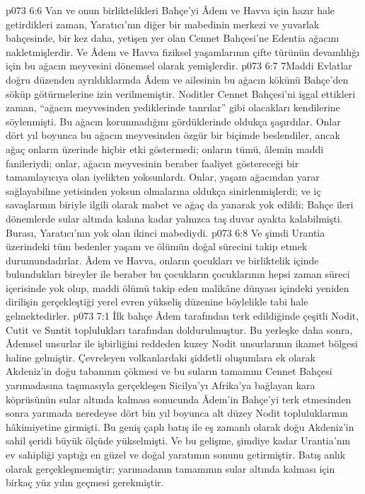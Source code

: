 \vs p073 6:6 Van ve onun birliktelikleri Bahçe’yi Âdem ve Havva için hazır hale getirdikleri zaman, Yaratıcı’nın diğer bir mabedinin merkezi ve yuvarlak bahçesinde, bir kez daha, yetişen yer olan Cennet Bahçesi’ne Edentia ağacını nakletmişlerdir. Ve Âdem ve Havva fiziksel yaşamlarının çifte türünün devamlılığı için bu ağacın meyvesini dönemsel olarak yemişlerdir.
\vs p073 6:7 7Maddi Evlatlar doğru düzenden ayrıldıklarında Âdem ve ailesinin bu ağacın kökünü Bahçe’den söküp götürmelerine izin verilmemiştir. Noditler Cennet Bahçesi’ni işgal ettikleri zaman, “ağacın meyvesinden yediklerinde tanrılar” gibi olacakları kendilerine söylenmişti. Bu ağacın korunmadığını gördüklerinde oldukça şaşırdılar. Onlar dört yıl boyunca bu ağacın meyvesinden özgür bir biçimde beslendiler, ancak ağaç onların üzerinde hiçbir etki göstermedi; onların tümü, âlemin maddi fanileriydi; onlar, ağacın meyvesinin beraber faaliyet göstereceği bir tamamlayıcıya olan iyelikten yoksunlardı. Onlar, yaşam ağacından yarar sağlayabilme yetisinden yoksun olmalarına oldukça sinirlenmişlerdi; ve iç savaşlarının biriyle ilgili olarak mabet ve ağaç da yanarak yok edildi; Bahçe ileri dönemlerde sular altında kalana kadar yalnızca taş duvar ayakta kalabilmişti. Burası, Yaratıcı’nın yok olan ikinci mabediydi.
\vs p073 6:8 Ve şimdi Urantia üzerindeki tüm bedenler yaşam ve ölümün doğal sürecini takip etmek durumundadırlar. Âdem ve Havva, onların çocukları ve birliktelik içinde bulundukları bireyler ile beraber bu çocukların çocuklarının hepsi zaman süreci içerisinde yok olup, maddi ölümü takip eden malikâne dünyası içindeki yeniden dirilişin gerçekleştiği yerel evren yükseliş düzenine böylelikle tabi hale gelmektedirler.
\vs p073 7:1 İlk bahçe Âdem tarafından terk edildiğinde çeşitli Nodit, Cutit ve Suntit toplulukları tarafından doldurulmuştur. Bu yerleşke daha sonra, Âdemsel unsurlar ile işbirliğini reddeden kuzey Nodit unsurlarının ikamet bölgesi haline gelmiştir. Çevreleyen volkanlardaki şiddetli oluşumlara ek olarak Akdeniz’in doğu tabanının çökmesi ve bu suların tamamını Cennet Bahçesi yarımadasına taşımasıyla gerçekleşen Sicilya’yı Afrika’ya bağlayan kara köprüsünün sular altında kalması sonucunda Âdem’in Bahçe’yi terk etmesinden sonra yarımada neredeyse dört bin yıl boyunca alt düzey Nodit topluluklarının hâkimiyetine girmişti. Bu geniş çaplı batış ile eş zamanlı olarak doğu Akdeniz’in sahil şeridi büyük ölçüde yükselmişti. Ve bu gelişme, şimdiye kadar Urantia’nın ev sahipliği yaptığı en güzel ve doğal yaratımın sonunu getirmiştir. Batış anlık olarak gerçekleşmemiştir; yarımadanın tamamının sular altında kalması için birkaç yüz yılın geçmesi gerekmiştir.
